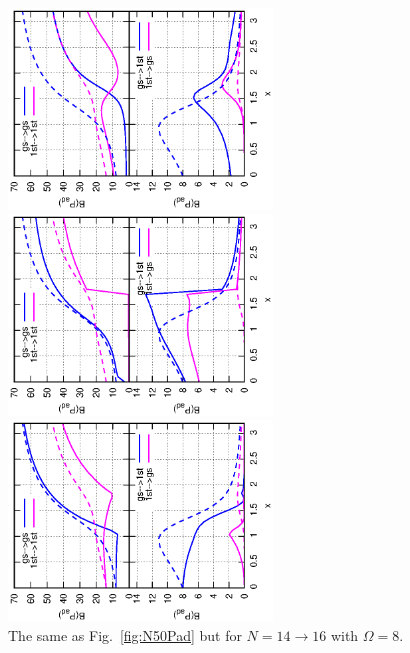 \documentclass[%
superscriptaddress,
preprint,
showpacs,
nofootinbib,
amsmath,amssymb,
aps,
prc,
floatfix ]%
{revtex4-1}
\begin{document}
\begin{figure}[htbp]
 \begin{minipage}{0.3\hsize}
 \begin{center}
  \includegraphics[width=70mm,angle=-90]{N16Pad_CQ.eps}
 \end{center}
 \captionsetup{labelformat=empty,labelsep=none}
 \end{minipage}
 \begin{minipage}{0.3\hsize}
 \begin{center}
  \includegraphics[width=70mm,angle=-90]{N16Pad_FD.eps}
 \end{center}
 \captionsetup{labelformat=empty,labelsep=none}
 \end{minipage}
 \begin{minipage}{0.3\hsize}
 \begin{center}
  \includegraphics[width=70mm,angle=-90]{N16Pad_SPA.eps}
 \end{center}
 \captionsetup{labelformat=empty,labelsep=none}
 \end{minipage}
	\caption{The same as Fig.~\ref{fig:N50Pad} but for $N=14\rightarrow 16$
	with $\Omega=8$.
}
 \label{fig:N16Pad}
\end{figure}
\end{document}
